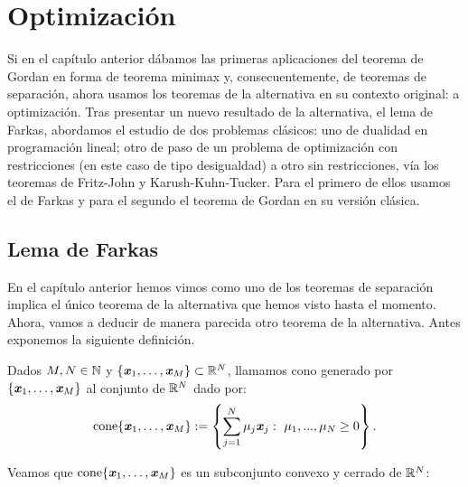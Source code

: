 \chapter{Optimización}
Si en el capítulo anterior dábamos las primeras aplicaciones del teorema de Gordan en forma de teorema minimax y, consecuentemente, de teoremas de separación, ahora usamos los teoremas de la alternativa en su contexto original: a optimización. Tras presentar un nuevo resultado de la alternativa, el lema de Farkas, abordamos el estudio de dos problemas clásicos: uno de dualidad en programación lineal; otro de paso de un problema de optimización con restricciones (en este caso de tipo desigualdad) a otro sin restricciones, vía los teoremas de Fritz-John y Karush-Kuhn-Tucker. Para el primero de ellos usamos el de Farkas y para el segundo el teorema de Gordan en su versión clásica.

\section{Lema de Farkas}
\newcommand{\bb}{\textbf{\emph{b}}}
\newcommand{\cc}{\textbf{\emph{c}}}

En el capítulo anterior hemos vimos como uno de los teoremas de separación implica el único teorema de la alternativa que hemos visto hasta el momento. Ahora, vamos a deducir de manera parecida otro teorema de la alternativa. Antes exponemos la siguiente definición.

\begin{definicion}
	Dados $ M, N \in \mathbb{N} $ y $ \{\textbf{\emph{x}}_1,\dots, \textbf{\emph{x}}_M \} \subset \mathbb{R}^N  $, llamamos cono generado por $ \{\textbf{\emph{x}}_1,\dots, \textbf{\emph{x}}_M \} $ al conjunto de $ \mathbb{R}^N $ dado por:
	\begin{equation*}
	\mathrm{cone}\{\textbf{\emph{x}}_1,\dots, \textbf{\emph{x}}_M \} := \left\lbrace \sum_{j=1}^{N}{\mu_j \textbf{\emph{x}}_j } : \text{ } \mu_1,...,\mu_N \geq 0 \right\rbrace .
	\end{equation*}
\end{definicion}

Veamos que $ \mathrm{cone}\{\textbf{\emph{x}}_1,\dots, \textbf{\emph{x}}_M \} $ es un subconjunto convexo y cerrado de $ \mathbb{R}^N $:

